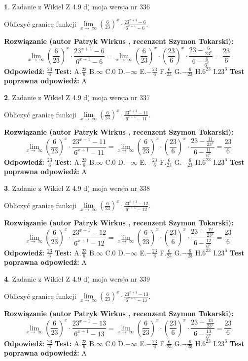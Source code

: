 \documentclass[12pt, a4paper]{article}
\theoremstyle{definition} %
\newtheorem{zad}{}
\newcommand{\zadStart}[1]{\begin{zad}#1\newline}
\newcommand{\zadStop}{\end{zad}}
\newcommand{\rozwStart}[2]{\noindent \textbf{Rozwiązanie (autor #1 , recenzent #2): }\newline}
\newcommand{\rozwStop}{\newline}
\newcommand{\odpStart}{\noindent \textbf{Odpowiedź:}\newline}
\newcommand{\odpStop}{\newline}
\newcommand{\testStart}{\noindent \textbf{Test:}\newline}
\newcommand{\testStop}{\newline}
\newcommand{\kluczStart}{\noindent \textbf{Test poprawna odpowiedź:}\newline}
\newcommand{\kluczStop}{\newline}
\begin{document}
\zadStart{Zadanie z Wikieł Z 4.9 d) moja wersja nr 336}


Obliczyć granicę funkcji  $\lim\limits_{x\to\ \infty}(\frac{6}{23})^{x}\cdot\frac{23^{x+1}-6}{6^{x+1}-6}$.
\zadStop
\rozwStart{Patryk Wirkus}{Szymon Tokarski}
$$\lim\limits_{x\to\ \infty}(\frac{6}{23})^{x}\cdot\frac{23^{x+1}-6}{6^{x+1}-6}=\lim\limits_{x\to\ \infty}(\frac{6}{23})^{x}\cdot(\frac{23}{6})^{x} \cdot \frac{23-\frac{6}{23^{x}}}{6-\frac{6}{6^{x}}} = \frac{23}{6}$$
\rozwStop
\odpStart
$\frac{23}{6}$
\odpStop
\testStart
A.$\frac{23}{6}$ B.$\infty$ C.$0$ D.$-\infty$ E.$-\frac{23}{6}$
F.$\frac{6}{23}$ G.$-\frac{6}{23}$
H.$6^{23}$
I.$23^{6}$
\testStop
\kluczStart
A
\kluczStop



\zadStart{Zadanie z Wikieł Z 4.9 d) moja wersja nr 337}


Obliczyć granicę funkcji  $\lim\limits_{x\to\ \infty}(\frac{6}{23})^{x}\cdot\frac{23^{x+1}-11}{6^{x+1}-11}$.
\zadStop
\rozwStart{Patryk Wirkus}{Szymon Tokarski}
$$\lim\limits_{x\to\ \infty}(\frac{6}{23})^{x}\cdot\frac{23^{x+1}-11}{6^{x+1}-11}=\lim\limits_{x\to\ \infty}(\frac{6}{23})^{x}\cdot(\frac{23}{6})^{x} \cdot \frac{23-\frac{11}{23^{x}}}{6-\frac{11}{6^{x}}} = \frac{23}{6}$$
\rozwStop
\odpStart
$\frac{23}{6}$
\odpStop
\testStart
A.$\frac{23}{6}$ B.$\infty$ C.$0$ D.$-\infty$ E.$-\frac{23}{6}$
F.$\frac{6}{23}$ G.$-\frac{6}{23}$
H.$6^{23}$
I.$23^{6}$
\testStop
\kluczStart
A
\kluczStop



\zadStart{Zadanie z Wikieł Z 4.9 d) moja wersja nr 338}


Obliczyć granicę funkcji  $\lim\limits_{x\to\ \infty}(\frac{6}{23})^{x}\cdot\frac{23^{x+1}-12}{6^{x+1}-12}$.
\zadStop
\rozwStart{Patryk Wirkus}{Szymon Tokarski}
$$\lim\limits_{x\to\ \infty}(\frac{6}{23})^{x}\cdot\frac{23^{x+1}-12}{6^{x+1}-12}=\lim\limits_{x\to\ \infty}(\frac{6}{23})^{x}\cdot(\frac{23}{6})^{x} \cdot \frac{23-\frac{12}{23^{x}}}{6-\frac{12}{6^{x}}} = \frac{23}{6}$$
\rozwStop
\odpStart
$\frac{23}{6}$
\odpStop
\testStart
A.$\frac{23}{6}$ B.$\infty$ C.$0$ D.$-\infty$ E.$-\frac{23}{6}$
F.$\frac{6}{23}$ G.$-\frac{6}{23}$
H.$6^{23}$
I.$23^{6}$
\testStop
\kluczStart
A
\kluczStop



\zadStart{Zadanie z Wikieł Z 4.9 d) moja wersja nr 339}


Obliczyć granicę funkcji  $\lim\limits_{x\to\ \infty}(\frac{6}{23})^{x}\cdot\frac{23^{x+1}-13}{6^{x+1}-13}$.
\zadStop
\rozwStart{Patryk Wirkus}{Szymon Tokarski}
$$\lim\limits_{x\to\ \infty}(\frac{6}{23})^{x}\cdot\frac{23^{x+1}-13}{6^{x+1}-13}=\lim\limits_{x\to\ \infty}(\frac{6}{23})^{x}\cdot(\frac{23}{6})^{x} \cdot \frac{23-\frac{13}{23^{x}}}{6-\frac{13}{6^{x}}} = \frac{23}{6}$$
\rozwStop
\odpStart
$\frac{23}{6}$
\odpStop
\testStart
A.$\frac{23}{6}$ B.$\infty$ C.$0$ D.$-\infty$ E.$-\frac{23}{6}$
F.$\frac{6}{23}$ G.$-\frac{6}{23}$
H.$6^{23}$
I.$23^{6}$
\testStop
\kluczStart
A
\kluczStop
\end{document}
